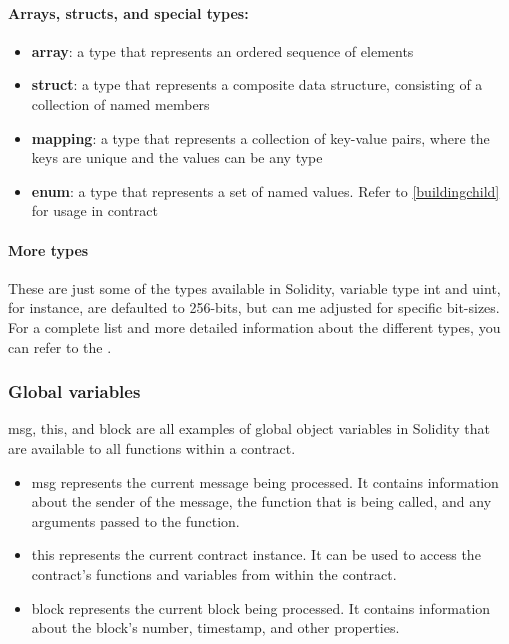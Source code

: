 \documentclass{article}
\theoremstyle{theorem}
\theoremstyle{definition}
\theoremstyle{remark}
\begin{document}
\paragraph{Arrays, structs, and special types:} \label{complex data}
\begin{itemize}
    \item \textbf{array}: a type that represents an ordered sequence of elements
    \item \textbf{struct}: a type that represents a composite data structure, consisting of a collection of named members
    \item \textbf{mapping}: a type that represents a collection of key-value pairs, where the keys are unique and the values can be any type
    \item \textbf{enum}: a type that represents a set of named values. Refer to \ref{buildingchild} for usage in contract 
\end{itemize}

\paragraph{More types}These are just some of the types available in Solidity, variable type int and uint, for instance, are defaulted to 256-bits, but can me adjusted for specific bit-sizes. For a complete list and more detailed information about the different types, you can refer to the \cite{SD}.



\subsubsection{Global variables} \label{global-variables}

\colorbox{Gainsboro!60!Lavender}{msg}, \colorbox{Gainsboro!60!Lavender}{this}, and \colorbox{Gainsboro!60!Lavender}{block} are all examples of global object variables in Solidity that are available to all functions within a contract.
\begin{itemize}
    \item \colorbox{Gainsboro!60!Lavender}{msg} represents the current message being processed. It contains information about the sender of the message, the function that is being called, and any arguments passed to the function.
    \item \colorbox{Gainsboro!60!Lavender}{this} represents the current contract instance. It can be used to access the contract's functions and variables from within the contract.
    \item \colorbox{Gainsboro!60!Lavender}{block} represents the current block being processed. It contains information about the block's number, timestamp, and other properties. 
\end{itemize}
\end{document}
